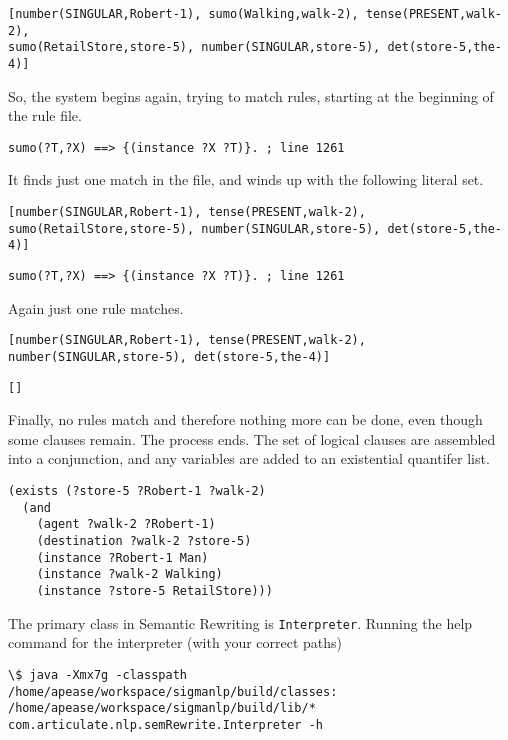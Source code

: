 \documentclass{book}
\begin{document}
\begin{verbatim}
[number(SINGULAR,Robert-1), sumo(Walking,walk-2), tense(PRESENT,walk-2), 
sumo(RetailStore,store-5), number(SINGULAR,store-5), det(store-5,the-4)]
\end{verbatim}

So, the system begins again, trying to match rules, starting at the 
beginning of the rule file.

\begin{verbatim}
sumo(?T,?X) ==> {(instance ?X ?T)}. ; line 1261
\end{verbatim}

It finds just one match in the file, and winds up with the following
literal set.

\begin{verbatim}
[number(SINGULAR,Robert-1), tense(PRESENT,walk-2), 
sumo(RetailStore,store-5), number(SINGULAR,store-5), det(store-5,the-4)]
\end{verbatim}

\begin{verbatim}
sumo(?T,?X) ==> {(instance ?X ?T)}. ; line 1261
\end{verbatim}

Again just one rule matches.

\begin{verbatim}
[number(SINGULAR,Robert-1), tense(PRESENT,walk-2), 
number(SINGULAR,store-5), det(store-5,the-4)]
\end{verbatim}

\begin{verbatim}
[]
\end{verbatim}

Finally, no rules match and therefore nothing more can be done, even 
though some clauses remain.  The process ends.  The set of logical
clauses are assembled into a conjunction, and any variables are added
to an existential quantifer list.

\begin{verbatim}
(exists (?store-5 ?Robert-1 ?walk-2) 
  (and 
    (agent ?walk-2 ?Robert-1)
    (destination ?walk-2 ?store-5)
    (instance ?Robert-1 Man)
    (instance ?walk-2 Walking)
    (instance ?store-5 RetailStore))) 
\end{verbatim}

The primary class in Semantic Rewriting is
\texttt{Interpreter}. Running the help command for
the interpreter (with your correct paths)

\begin{verbatim}
\$ java -Xmx7g -classpath /home/apease/workspace/sigmanlp/build/classes:
/home/apease/workspace/sigmanlp/build/lib/*  
com.articulate.nlp.semRewrite.Interpreter -h
\end{verbatim}
\end{document}
